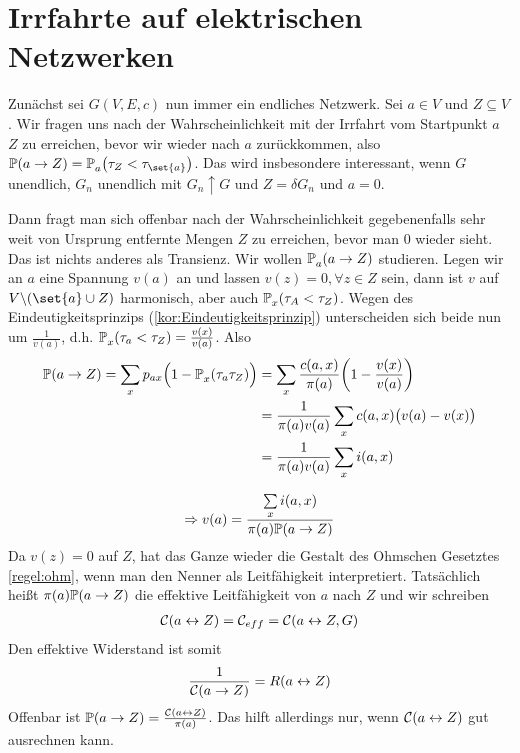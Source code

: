 \section{Irrfahrte auf elektrischen Netzwerken}
Zunächst sei $G(V,E,c)$ nun immer ein endliches Netzwerk. Sei $a \in V$ und $Z \subseteq V$. Wir fragen uns nach der Wahrscheinlichkeit mit der Irrfahrt vom Startpunkt $a$ $Z$ zu erreichen, bevor wir wieder nach $a$ zurückkommen, also $\prop{a \to Z} = \prop{\tau_Z < \tau_{\set{a}}}[][a]$. Das wird insbesondere interessant, wenn $G$ unendlich, $G_n$ unendlich mit $G_n \uparrow G$ und  $Z = \delta G_n$ und $a=0$.

Dann fragt man sich offenbar nach der Wahrscheinlichkeit gegebenenfalls sehr weit von Ursprung entfernte Mengen $Z$ zu erreichen, bevor man $0$ wieder sieht. Das ist nichts anderes als Transienz. Wir wollen $\propE{a \to Z}[][a]$ studieren. Legen wir an $a$ eine Spannung $v(a)$ an und lassen $v(z) = 0, \forall z \in Z$ sein, dann ist $v$ auf $V \backslash(\set{a}\cup Z)$ harmonisch, aber auch $\propE{\tau_A < \tau_Z}[][x]$. Wegen des Eindeutigkeitsprinzips (\ref{kor:Eindeutigkeitsprinzip}) unterscheiden sich beide nun um $\frac{1}{v(a)}$, d.h. $\prop{\tau_a < \tau_Z}[][x] = \frac{v(x)}{v(a)}$. Also
\begin{align}
	\prop{a \to Z} = \sum\limits_{x}p_{ax} \Big(1-\prop{\tau_a \tau_Z}[][x] \Big) &= \sum\limits_{x}\frac{c(a,x)}{\pi(a)}\enb{1-\frac{v(x)}{v(a)}} \\
	&= \frac{1}{\pi(a)v(a)}\sum\limits_{x}c(a,x)\big(v(a)-v(x) \big) \\
	&= \frac{1}{\pi(a)v(a)}\sum\limits_{x}i(a,x)
\end{align}

\begin{align}
	\Rightarrow v(a) = \frac{\sum\limits_{x}i(a,x)}{\pi(a)\prop{a \to Z}}
\end{align}
Da $v(z) = 0$ auf $Z$, hat das Ganze wieder die Gestalt des Ohmschen Gesetztes \ref{regel:ohm}, wenn man den Nenner als Leitfähigkeit interpretiert. Tatsächlich heißt $\pi(a)\prop{a \to Z}$ die effektive Leitfähigkeit von $a$ nach $Z$ und wir schreiben
\begin{align} 
	\leit{a \leftrightarrow Z} = \mathcal{C}_{eff}  = \leit{a\leftrightarrow Z,G}
\end{align}
Den effektive Widerstand ist somit 
\begin{align}
	\frac{1}{\leit{a \to Z}} = R(a \leftrightarrow Z)
\end{align}
Offenbar ist $\prop{a\to Z} = \frac{\leit{a \leftrightarrow Z}}{\pi(a)}$. Das hilft allerdings nur, wenn $\leit{a \leftrightarrow Z}$ gut ausrechnen kann. 

